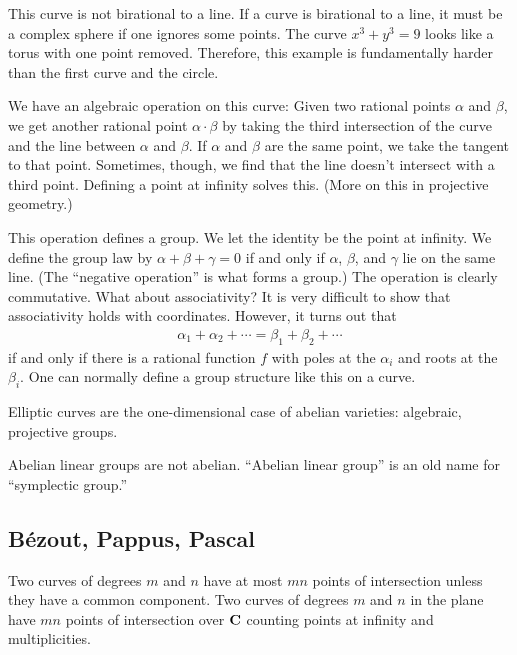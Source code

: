 \documentclass [11 pt, oneside, margin = 1 in] {article}
\begin{document}
This curve is not birational to a line. If a curve is birational to a line, it must be a complex sphere if one ignores some points. The curve $x^3 + y^3 =9$ looks like a torus with one point removed. Therefore, this example is fundamentally harder than the first curve and the circle.

We have an algebraic operation on this curve: Given two rational points $\alpha$ and $\beta$, we get another rational point $\alpha\cdot \beta$ by taking the third intersection of the curve and the line between $\alpha$ and $\beta$. If $\alpha$ and $\beta$ are the same point, we take the tangent to that point. Sometimes, though, we find that the line doesn't intersect with a third point. Defining a point at infinity solves this. (More on this in projective geometry.)

This operation defines a group. We let the identity be the point at infinity. We define the group law by $\alpha+\beta+\gamma = 0$ if and only if $\alpha$, $\beta$, and $\gamma$ lie on the same line. (The ``negative operation'' is what forms a group.) The operation is clearly commutative. What about associativity? It is very difficult to show that associativity holds with coordinates. However, it turns out that
\begin{align*}
	\alpha_1+\alpha_2+\cdots = \beta_1+\beta_2+\cdots
\end{align*}
if and only if there is a rational function $f$ with poles at the $\alpha_i$ and roots at the $\beta_i$. One can normally define a group structure like this on a curve.

Elliptic curves are the one-dimensional case of abelian varieties: algebraic, projective groups.
\begin{warn}
	Abelian linear groups are not abelian. ``Abelian linear group'' is an old name for ``symplectic group.'' 
\end{warn}

\subsection{B\'ezout, Pappus, Pascal}
\label{s_3}

\begin{theorem}
	\label{}\text{}
Two curves of degrees $m$ and $n$ have at most $mn$ points of intersection unless they have a common component. Two curves of degrees $m$ and $n$ in the plane have $mn$ points of intersection over $\mathbf C$ counting points at infinity and multiplicities.
\end{theorem}
\end{document}

